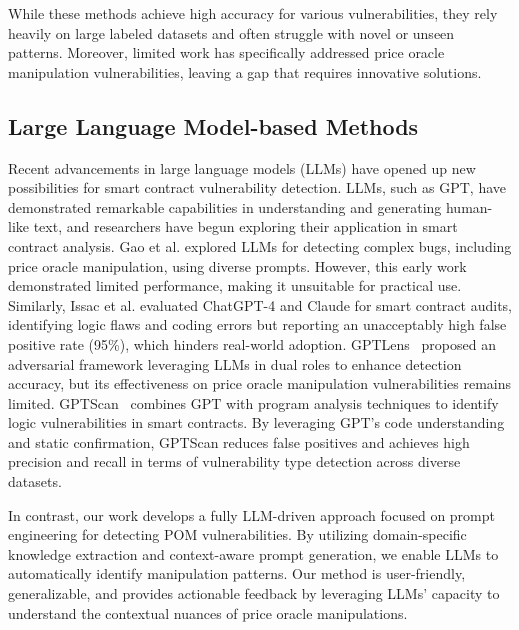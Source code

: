 While these methods achieve high accuracy for various vulnerabilities, they rely heavily on large labeled datasets and often struggle with novel or unseen patterns. Moreover, limited work has specifically addressed price oracle manipulation vulnerabilities, leaving a gap that requires innovative solutions.

\subsection{Large Language Model-based Methods} \label{Large Language Model-based Methods}
Recent advancements in large language models (LLMs) have opened up new possibilities for smart contract vulnerability detection. LLMs, such as GPT, have demonstrated remarkable capabilities in understanding and generating human-like text, and researchers have begun exploring their application in smart contract analysis.
Gao et al.\cite{gao2024unveiling} explored LLMs for detecting complex bugs, including price oracle manipulation, using diverse prompts. However, this early work demonstrated limited performance, making it unsuitable for practical use. Similarly, Issac et al.\cite{david2023you} evaluated ChatGPT-4 and Claude for smart contract audits, identifying logic flaws and coding errors but reporting an unacceptably high false positive rate (95\%), which hinders real-world adoption. GPTLens~\cite{hu2023large} proposed an adversarial framework leveraging LLMs in dual roles to enhance detection accuracy, but its effectiveness on price oracle manipulation vulnerabilities remains limited.
GPTScan~\cite{sun2023gptscan} combines GPT with program analysis techniques to identify logic vulnerabilities in smart contracts. By leveraging GPT's code understanding and static confirmation, GPTScan reduces false positives and achieves high precision and recall in terms of vulnerability type detection across diverse datasets. 

In contrast, our work develops a fully LLM-driven approach focused on prompt engineering for detecting POM vulnerabilities. 
By utilizing domain-specific knowledge extraction and context-aware prompt generation, we enable LLMs to automatically identify manipulation patterns. Our method is user-friendly, generalizable, and provides actionable feedback by leveraging LLMs' capacity to understand the contextual 
nuances of price oracle manipulations.








